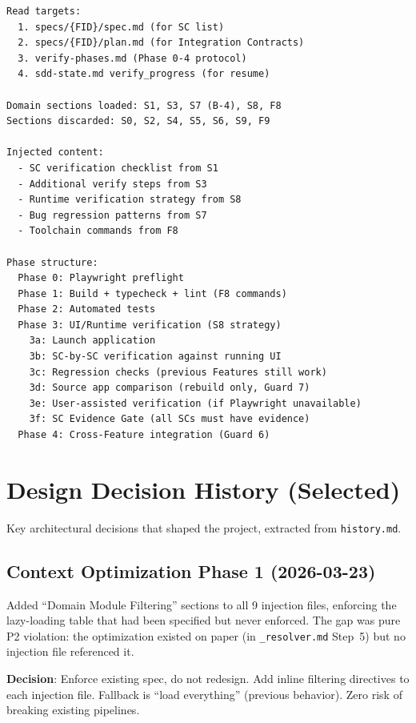 \documentclass[11pt,a4paper,openright,twoside]{report}
\newcommand{\file}[1]{\texttt{#1}}
\begin{document}
\begin{lstlisting}[title={verify Context Assembly}]
Read targets:
  1. specs/{FID}/spec.md (for SC list)
  2. specs/{FID}/plan.md (for Integration Contracts)
  3. verify-phases.md (Phase 0-4 protocol)
  4. sdd-state.md verify_progress (for resume)

Domain sections loaded: S1, S3, S7 (B-4), S8, F8
Sections discarded: S0, S2, S4, S5, S6, S9, F9

Injected content:
  - SC verification checklist from S1
  - Additional verify steps from S3
  - Runtime verification strategy from S8
  - Bug regression patterns from S7
  - Toolchain commands from F8

Phase structure:
  Phase 0: Playwright preflight
  Phase 1: Build + typecheck + lint (F8 commands)
  Phase 2: Automated tests
  Phase 3: UI/Runtime verification (S8 strategy)
    3a: Launch application
    3b: SC-by-SC verification against running UI
    3c: Regression checks (previous Features still work)
    3d: Source app comparison (rebuild only, Guard 7)
    3e: User-assisted verification (if Playwright unavailable)
    3f: SC Evidence Gate (all SCs must have evidence)
  Phase 4: Cross-Feature integration (Guard 6)
\end{lstlisting}


\chapter{Design Decision History (Selected)}
\label{app:history}

Key architectural decisions that shaped the project, extracted from \file{history.md}.

\section{Context Optimization Phase 1 (2026-03-23)}

Added ``Domain Module Filtering'' sections to all 9 injection files, enforcing the lazy-loading table that had been specified but never enforced. The gap was pure P2 violation: the optimization existed on paper (in \file{\_resolver.md} Step~5) but no injection file referenced it.

\textbf{Decision}: Enforce existing spec, do not redesign. Add inline filtering directives to each injection file. Fallback is ``load everything'' (previous behavior). Zero risk of breaking existing pipelines.
\end{document}

